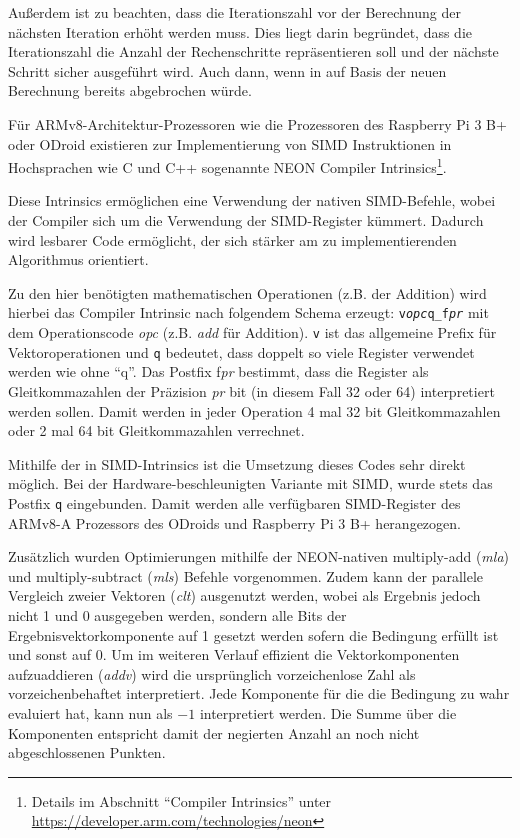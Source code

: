 Außerdem ist zu beachten, dass die Iterationszahl vor der Berechnung der nächsten Iteration erhöht werden muss.
Dies liegt darin begründet, dass die Iterationszahl die Anzahl der Rechenschritte repräsentieren soll und
der nächste Schritt sicher ausgeführt wird.
Auch dann, wenn in auf Basis der neuen Berechnung bereits abgebrochen würde.

\begin{figure}[h!]
	
\end{figure}

Für ARMv8-Architektur-Prozessoren wie die Prozessoren des Raspberry Pi 3 B+ oder ODroid
existieren zur Implementierung von SIMD Instruktionen in Hochsprachen wie C und C++ sogenannte
NEON Compiler Intrinsics\footnote{Details im Abschnitt \enquote{Compiler Intrinsics} unter \url{https://developer.arm.com/technologies/neon}}.

Diese Intrinsics ermöglichen eine Verwendung der nativen SIMD-Befehle, wobei der Compiler sich um die Verwendung der SIMD-Register kümmert.
Dadurch wird lesbarer Code ermöglicht, der sich stärker am zu implementierenden Algorithmus orientiert.

Zu den hier benötigten mathematischen Operationen (z.B. der Addition) wird hierbei das Compiler Intrinsic nach folgendem Schema erzeugt:
\texttt{v\textit{opc}q\_f\textit{pr}} mit dem Operationscode \textit{opc} (z.B. \textit{add} für Addition).
\verb|v| ist das allgemeine Prefix für Vektoroperationen und \verb|q| bedeutet, dass doppelt so viele Register verwendet werden wie ohne \enquote{q}.
Das Postfix f\textit{pr} bestimmt, dass die Register als Gleitkommazahlen der Präzision \textit{pr} bit (in diesem Fall 32 oder 64) interpretiert werden sollen.
Damit werden in jeder Operation 4 mal 32 bit Gleitkommazahlen oder 2 mal 64 bit Gleitkommazahlen verrechnet.

Mithilfe der in SIMD-Intrinsics ist die Umsetzung dieses Codes sehr direkt möglich.
Bei der Hardware-beschleunigten Variante mit SIMD, wurde stets das Postfix \verb|q| eingebunden.
Damit werden alle verfügbaren SIMD-Register des ARMv8-A Prozessors des ODroids und Raspberry Pi 3 B+ herangezogen.

Zusätzlich wurden Optimierungen mithilfe der NEON-nativen multiply-add (\textit{mla}) und multiply-subtract (\textit{mls}) Befehle vorgenommen.
Zudem kann der parallele Vergleich zweier Vektoren (\textit{clt}) ausgenutzt werden, wobei als Ergebnis jedoch nicht 1 und 0 ausgegeben werden,
sondern alle Bits der Ergebnisvektorkomponente auf 1 gesetzt werden sofern die Bedingung erfüllt ist und sonst auf 0.
Um im weiteren Verlauf effizient die Vektorkomponenten aufzuaddieren (\textit{addv}) wird die ursprünglich vorzeichenlose Zahl als vorzeichenbehaftet interpretiert.
Jede Komponente für die die Bedingung zu wahr evaluiert hat, kann nun als $-1$ interpretiert werden.
Die Summe über die Komponenten entspricht damit der negierten Anzahl an noch nicht abgeschlossenen Punkten.

